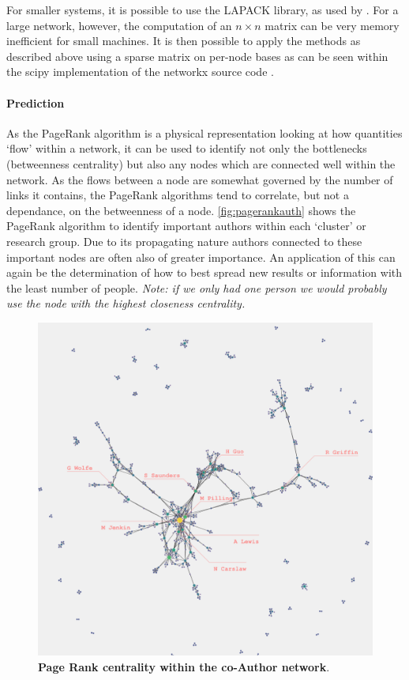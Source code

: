 For smaller systems, it is possible to use the LAPACK \citep{lapack} library, as used by \citep{numpy}. For a large network, however, the computation of an $n \times n $ matrix can be very memory inefficient for small machines. It is then possible to apply the methods as described above using a sparse matrix on per-node bases as can be seen within the scipy implementation of the networkx source code \citep{scipy,networkx}.

\paragraph{Prediction}\label{sec:applypr}
As the PageRank algorithm is a physical representation looking at how quantities `flow' within a network, it can be used to identify not only the bottlenecks (betweenness centrality) but also any nodes which are connected well within the network. As the flows between a node are somewhat governed by the number of links it contains, the PageRank algorithms tend to correlate, but not a dependance, on the betweenness of a node. \autoref{fig:pagerankauth} shows the PageRank algorithm to identify important authors within each `cluster' or research group. Due to its propagating nature authors connected to these important nodes are often also of greater importance. An application of this can again be the determination of how to best spread new results or information with the least number of people. \textit{Note: if we only had one person we would probably use the node with the highest closeness centrality.}

\begin{figure}[H]
     \centering
         \includegraphics[width=.8\textwidth]{figures_c3/pagerankauthor.png}

        
                \caption{ \textbf{Page Rank centrality within the co-Author network}.}
        \label{fig:pagerankauth}
\end{figure}


